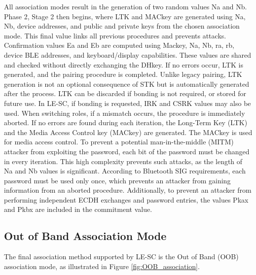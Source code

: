 \documentclass{Configuration_Files/PoliMi3i_thesis}
\begin{document}
All association modes result in the generation of two random values Na and Nb. Phase 2, Stage 2 then begins, where LTK and MACkey are generated using Na, Nb, device addresses, and public and private keys from the chosen association mode. This final value links all previous procedures and prevents attacks. Confirmation values Ea and Eb are computed using Mackey, Na, Nb, ra, rb, device BLE addresses, and keyboard/display capabilities. These values are shared and checked without directly exchanging the DHkey. If no errors occur, LTK is generated, and the pairing procedure is completed. Unlike legacy pairing, LTK generation is not an optional consequence of STK but is automatically generated after the process. LTK can be discarded if bonding is not required, or stored for future use. In LE-SC, if bonding is requested, IRK and CSRK values may also be used.
When switching roles, if a mismatch occurs, the procedure is immediately aborted. If no errors are found during each iteration, the Long-Term Key (LTK) and the Media Access Control key (MACkey) are generated. The MACkey is used for media access control. To prevent a potential man-in-the-middle (MITM) attacker from exploiting the password, each bit of the password must be changed in every iteration. This high complexity prevents such attacks, as the length of Na and Nb values is significant. According to Bluetooth SIG requirements, each password must be used only once, which prevents an attacker from gaining information from an aborted procedure. Additionally, to prevent an attacker from performing independent ECDH exchanges and password entries, the values Pkax and Pkbx are included in the commitment value.

\subsection{Out of Band Association Mode}

The final association method supported by LE-SC is the Out of Band (OOB) association mode, as illustrated in Figure \ref{fig:OOB_association}.
\end{document}

